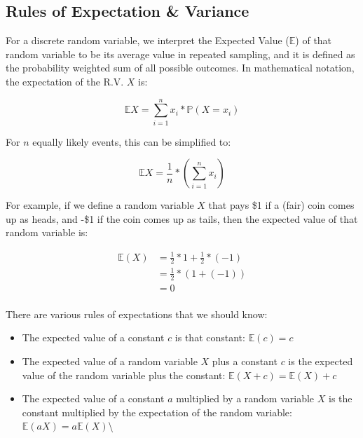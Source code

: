 \documentclass[]{book}
\providecommand{\tightlist}{%
  \setlength{\itemsep}{0pt}\setlength{\parskip}{0pt}}
\theoremstyle{definition}
\theoremstyle{definition}
\theoremstyle{definition}
\theoremstyle{remark}
\begin{document}
\subsection*{Rules of Expectation \&
Variance}\label{rules-of-expectation-variance}

For a discrete random variable, we interpret the Expected Value
(\(\mathbb{E}\)) of that random variable to be its average value in
repeated sampling, and it is defined as the probability weighted sum of
all possible outcomes. In mathematical notation, the expectation of the
R.V. \(X\) is:

\begin{equation}
\mathbb{E}X = \sum\limits_{i=1}^n x_i * \mathbb{P}(X=x_i)
\end{equation}

For \(n\) equally likely events, this can be simplified to:

\begin{equation}
\mathbb{E}X = \frac{1}{n} * (\sum\limits_{i=1}^n x_i)
\end{equation}

For example, if we define a random variable \(X\) that pays \$1 if a
(fair) coin comes up as heads, and -\$1 if the coin comes up as tails,
then the expected value of that random variable is:

\begin{align*}
\mathbb{E}(X) &= \frac{1}{2}*1 + \frac{1}{2}*(-1)\\
&= \frac{1}{2} * (1 + (-1))\\
&= 0\\
\end{align*}

There are various rules of expectations that we should know:

\begin{itemize}
\tightlist
\item
  The expected value of a constant \(c\) is that constant:
  \(\mathbb{E}(c) = c\)
\item
  The expected value of a random variable \(X\) plus a constant \(c\) is
  the expected value of the random variable plus the constant:
  \(\mathbb{E}(X + c) = \mathbb{E}(X) + c\)
\item
  The expected value of a constant \(a\) multiplied by a random variable
  \(X\) is the constant multiplied by the expectation of the random
  variable: \(\mathbb{E}(aX) = a\mathbb{E}(X)\)\textbackslash{}
\end{itemize}
\end{document}
